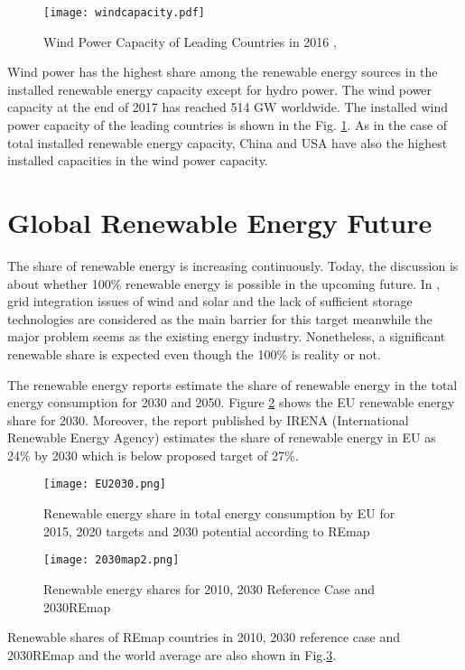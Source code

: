 \begin{figure}[h!]
	\centering
	\texttt{[image: windcapacity.pdf]}
	\caption{Wind Power Capacity of Leading Countries in 2016 \cite{InternationalRenewableEnergyAgencyIRENA2018},\cite{InternationalRenewableEnergyAgency2017}}
	\label{windcap}
\end{figure}
Wind power has the highest share among the renewable energy sources in the installed renewable energy capacity except for hydro power. The wind power capacity at the end of 2017 has reached 514 GW worldwide\cite{InternationalRenewableEnergyAgencyIRENA2018}. The installed wind power capacity of the leading countries is shown in the Fig. \ref{windcap}. As in the case of total installed renewable energy capacity, China and USA have also the highest installed capacities in the wind power capacity. \par
\section{Global Renewable Energy Future}
The share of renewable energy is increasing continuously. Today, the discussion is about whether 100\% renewable energy is possible in the upcoming future. In \cite{REN212017d}, grid integration issues of wind and solar and the lack of sufficient storage technologies are considered as the main barrier for this target meanwhile the major problem seems as the existing energy industry. Nonetheless, a significant renewable share is expected even though the 100\% is reality or not.\par
The renewable energy reports estimate the share of renewable energy in the total energy consumption for 2030 and 2050. Figure \ref{EU2030} shows the EU renewable energy share for 2030. Moreover, the report published by IRENA (International Renewable Energy Agency) estimates the share of renewable energy in EU as 24\% by 2030 which is below proposed target of 27\%\cite{IRENA2014}.\par
\begin{figure}[h!]
	\centering
	\texttt{[image: EU2030.png]}
	\caption{Renewable energy share in total energy consumption by EU for 2015, 2020 targets and 2030 potential according to REmap \cite{EuropeanCommission2018}}
	\label{EU2030}
\end{figure}
\begin{figure}[h!]
	\centering
	\texttt{[image: 2030map2.png]}
	\caption{Renewable energy shares for 2010, 2030 Reference Case and 2030REmap \cite{IRENA2014}}
	\label{2030map}
\end{figure}
Renewable shares of REmap countries in 2010, 2030 reference case and 2030REmap and the world average are also shown in Fig.\ref{2030map}. 
